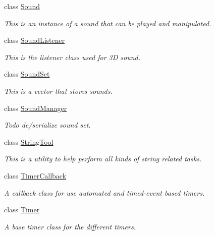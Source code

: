 \begin{DoxyCompactItemize}
class \hyperlink{classphys_1_1Sound}{Sound}
\begin{DoxyCompactList}\small\item\em This is an instance of a sound that can be played and manipulated. \item\end{DoxyCompactList}\item 
class \hyperlink{classphys_1_1SoundListener}{SoundListener}
\begin{DoxyCompactList}\small\item\em This is the listener class used for 3D sound. \item\end{DoxyCompactList}\item 
class \hyperlink{classphys_1_1SoundSet}{SoundSet}
\begin{DoxyCompactList}\small\item\em This is a vector that stores sounds. \item\end{DoxyCompactList}\item 
class \hyperlink{classphys_1_1SoundManager}{SoundManager}
\begin{DoxyCompactList}\small\item\em Todo de/serialize sound set. \item\end{DoxyCompactList}\item 
class \hyperlink{classphys_1_1StringTool}{StringTool}
\begin{DoxyCompactList}\small\item\em This is a utility to help perform all kinds of string related tasks. \item\end{DoxyCompactList}\item 
class \hyperlink{classphys_1_1TimerCallback}{TimerCallback}
\begin{DoxyCompactList}\small\item\em A callback class for use automated and timed-\/event based timers. \item\end{DoxyCompactList}\item 
class \hyperlink{classphys_1_1Timer}{Timer}
\begin{DoxyCompactList}\small\item\em A base timer class for the different timers. \item\end{DoxyCompactList}\item 

\end{DoxyCompactItemize}

